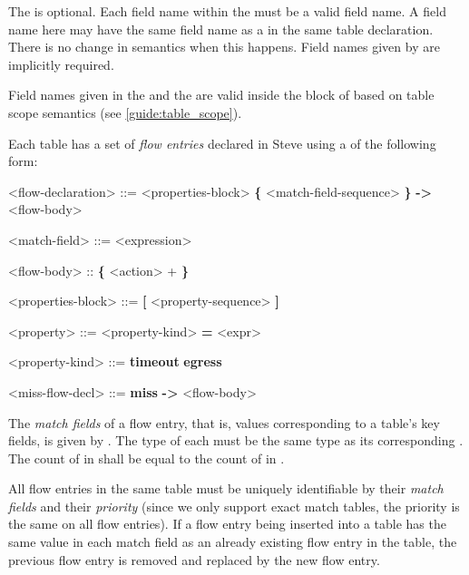 The  is optional. Each field name within the  must be a valid field name. A field name here may have the same field name as a  in the same table declaration. There is no change in semantics when this happens. Field names given by  are implicitly required.

Field names given in the  and the  are valid inside the block of  based on table scope semantics (see \ref{guide:table_scope}).

Each table has a set of \textit{flow entries} declared in Steve using a  of the following form:

\begin{minip}
\begin{grammar}
<flow-declaration> ::=
<properties-block>
\textbf{\{} <match-field-sequence> \textbf{\}} \textbf{-\textgreater} <flow-body>

<match-field> ::= <expression>

<flow-body> :: \textbf{\{} <action> + \textbf{\}}

<properties-block> ::=
\textbf{[} <property-sequence> \textbf{]}

<property> ::=
<property-kind> \textbf{=} <expr>

<property-kind> ::=
\textbf{timeout}
\alt \textbf{egress}

<miss-flow-decl> ::=
\textbf{miss} \textbf{-\textgreater} <flow-body>
\end{grammar}
\end{minip}

The \textit{match fields} of a flow entry, that is, values corresponding to a table's key fields, is given by . The type of each  must be the same type as its corresponding . The count of  in  shall be equal to the count of  in .

All flow entries in the same table must be uniquely identifiable by their \textit{match fields} and their \textit{priority} (since we only support exact match tables, the priority is the same on all flow entries). If a flow entry being inserted into a table has the same value in each match field as an already existing flow entry in the table, the previous flow entry is removed and replaced by the new flow entry.


